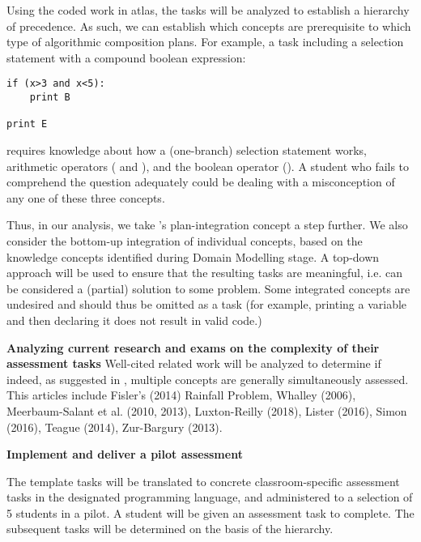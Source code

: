 Using the coded work in atlas, the tasks will be analyzed to establish a hierarchy of precedence. As such, we can establish which concepts are prerequisite to which type of algorithmic composition plans. For example, a task including a selection statement with a compound boolean expression:
\begin{verbatim}
if (x>3 and x<5):
    print B

print E
\end{verbatim}
requires knowledge about how a (one-branch) selection statement works, arithmetic operators (\jav{<} and \jav{>}), and the boolean operator (). A student who fails to comprehend the question adequately could be dealing with a misconception of any one of these three concepts.



Thus, in our analysis, we take \citeauthor{LuxtonReilly2018}'s plan-integration concept a step further. We also consider the bottom-up integration of individual concepts, based on the knowledge concepts identified during Domain Modelling stage. A top-down approach will be used to ensure that the resulting tasks are meaningful, i.e. can be considered a (partial) solution to some problem. Some integrated concepts are undesired and should thus be omitted as a task (for example, printing a variable and then declaring it does not result in valid code.)



\noindent \textbf{Analyzing current research and exams on the complexity of their assessment tasks}\newline
Well-cited related work will be analyzed to determine if indeed, as suggested in , multiple concepts are generally simultaneously assessed. This articles include Fisler's (2014) Rainfall Problem, Whalley (2006), Meerbaum-Salant et al. (2010, 2013), Luxton-Reilly (2018), Lister (2016), Simon (2016), Teague (2014), Zur-Bargury (2013).

%

\noindent \textbf{Implement and deliver a pilot assessment}\newline

The template tasks will be translated to concrete classroom-specific assessment tasks in the designated programming language, and administered to a selection of 5 students in a pilot. A student will be given an assessment task to complete. The subsequent tasks will be determined on the basis of the hierarchy.

